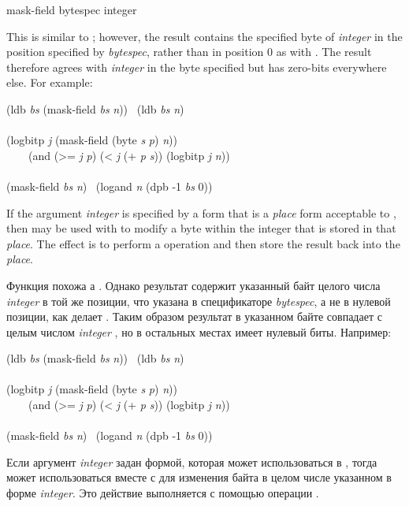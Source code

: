 \begin{defun}[Function]
mask-field bytespec integer

This is similar to ; however, the result contains
the specified byte
of \emph{integer} in the position specified by \emph{bytespec},
rather than in position 0 as with .
The result therefore agrees with \emph{integer} in the byte specified
but has zero-bits everywhere else.
For example:
\begin{lisp}
(ldb \emph{bs} (mask-field \emph{bs} \emph{n})) \EQ\ (ldb \emph{bs} \emph{n}) \\
 \\
(logbitp \emph{j} (mask-field (byte \emph{s} \emph{p}) \emph{n})) \\
~~~\EQ\ (and (>= \emph{j} \emph{p}) (< \emph{j} (+ \emph{p} \emph{s})) (logbitp \emph{j} \emph{n})) \\
 \\
(mask-field \emph{bs} \emph{n}) \EQ\ (logand \emph{n} (dpb -1 \emph{bs} 0))
\end{lisp}

If the argument \emph{integer} is specified by a form that is a \emph{place} form
acceptable to ,
then  may be used with 
to modify a byte within the integer that is stored
in that \emph{place}.
The effect is to perform a  operation
and then store the result back into the \emph{place}.

Функция похожа а . Однако результат содержит указанный байт целого
числа \emph{integer} в той же позиции, что указана в спецификаторе
\emph{bytespec}, а не в нулевой позиции, как делает .
Таким образом результат в указанном байте совпадает с целым числом
\emph{integer} , но в остальных местах имеет нулевый биты.
Например:
\begin{lisp}
(ldb \emph{bs} (mask-field \emph{bs} \emph{n})) \EQ\ (ldb \emph{bs} \emph{n}) \\
 \\
(logbitp \emph{j} (mask-field (byte \emph{s} \emph{p}) \emph{n})) \\
~~~\EQ\ (and (>= \emph{j} \emph{p}) (< \emph{j} (+ \emph{p} \emph{s})) (logbitp \emph{j} \emph{n})) \\
 \\
(mask-field \emph{bs} \emph{n}) \EQ\ (logand \emph{n} (dpb -1 \emph{bs} 0))
\end{lisp}

Если аргумент \emph{integer} задан формой, которая может использоваться в
, тогда  может использоваться вместе с  для
изменения байта в целом числе указанном в форме \emph{integer}.
Это действие выполняется с помощью операции .
\end{defun}

